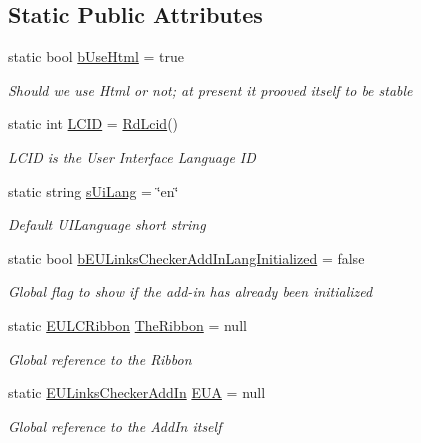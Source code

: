 \subsection*{Static Public Attributes}
\begin{DoxyCompactItemize}
\item 
static bool \hyperlink{class_e_u_cases_1_1_e_u_links_checker_word_add_in_1_1_e_u_links_checker_add_in_a0fa8c4fb8d444bef6bd8ebba9b206659}{b\+Use\+Html} = true
\begin{DoxyCompactList}\small\item\em Should we use Html or not; at present it prooved itself to be stable \end{DoxyCompactList}\item 
static int \hyperlink{class_e_u_cases_1_1_e_u_links_checker_word_add_in_1_1_e_u_links_checker_add_in_ae035597b4e995c3782a01272e4788c78}{L\+C\+I\+D} = \hyperlink{class_e_u_cases_1_1_e_u_links_checker_word_add_in_1_1_e_u_links_checker_add_in_a69d77593a2a9803c1b8cbea399a8f344}{Rd\+Lcid}()
\begin{DoxyCompactList}\small\item\em L\+C\+I\+D is the User Interface Language I\+D \end{DoxyCompactList}\item 
static string \hyperlink{class_e_u_cases_1_1_e_u_links_checker_word_add_in_1_1_e_u_links_checker_add_in_a32392d4567855287a3721141c70c4b06}{s\+Ui\+Lang} = \char`\"{}en\char`\"{}
\begin{DoxyCompactList}\small\item\em Default U\+I\+Language short string \end{DoxyCompactList}\item 
static bool \hyperlink{class_e_u_cases_1_1_e_u_links_checker_word_add_in_1_1_e_u_links_checker_add_in_a2f32b3a49a5a69cc9a5ae4ad92d8a929}{b\+E\+U\+Links\+Checker\+Add\+In\+Lang\+Initialized} = false
\begin{DoxyCompactList}\small\item\em Global flag to show if the add-\/in has already been initialized \end{DoxyCompactList}\item 
static \hyperlink{class_e_u_cases_1_1_e_u_links_checker_word_add_in_1_1_e_u_l_c_ribbon}{E\+U\+L\+C\+Ribbon} \hyperlink{class_e_u_cases_1_1_e_u_links_checker_word_add_in_1_1_e_u_links_checker_add_in_ace22c63ff90afd2450986db7d8c234b6}{The\+Ribbon} = null
\begin{DoxyCompactList}\small\item\em Global reference to the Ribbon \end{DoxyCompactList}\item 
static \hyperlink{class_e_u_cases_1_1_e_u_links_checker_word_add_in_1_1_e_u_links_checker_add_in}{E\+U\+Links\+Checker\+Add\+In} \hyperlink{class_e_u_cases_1_1_e_u_links_checker_word_add_in_1_1_e_u_links_checker_add_in_adde4be8c11a6e6c6d27857ab59ae0d74}{E\+U\+A} = null
\begin{DoxyCompactList}\small\item\em Global reference to the Add\+In itself \end{DoxyCompactList}\end{DoxyCompactItemize}
